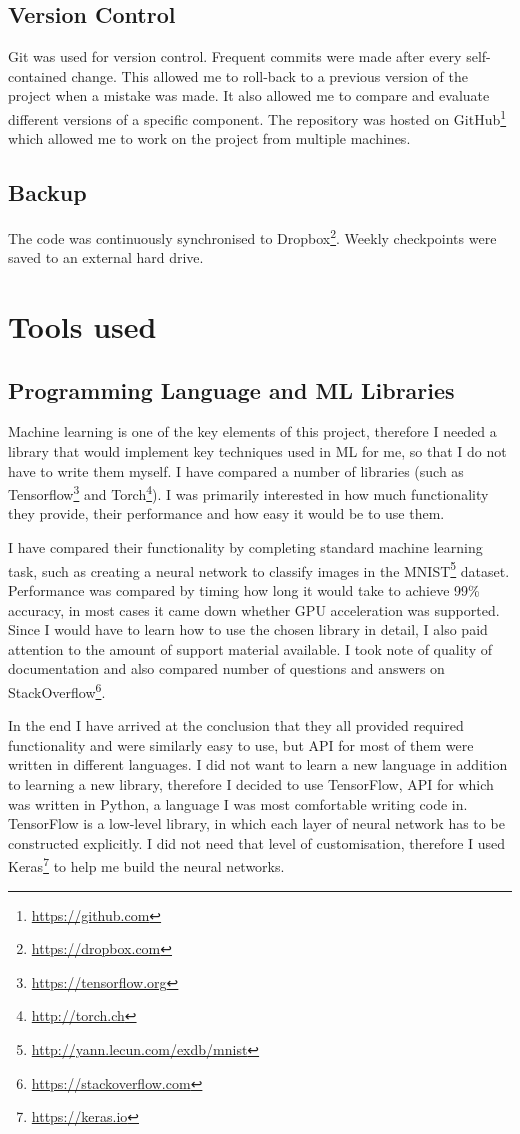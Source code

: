 \documentclass[12pt,a4paper]{book}
\begin{document}
\subsection{Version Control}
Git was used for version control.
Frequent commits were made after every self-contained change.
This allowed me to roll-back to a previous version of the project when a mistake was made.
It also allowed me to compare and evaluate different versions of a specific component.
The repository was hosted on GitHub\footnote{\url{https://github.com}} which allowed me to work on the project from multiple machines.
\subsection{Backup}
The code was continuously synchronised to Dropbox\footnote{\url{https://dropbox.com}}.
Weekly checkpoints were saved to an external hard drive.
\section{Tools used}
\subsection{Programming Language and ML Libraries}
Machine learning is one of the key elements of this project, therefore I needed a library that would implement key techniques used in ML for me, so that I do not have to write them myself.
I have compared a number of libraries (such as Tensorflow\footnote{\url{https://tensorflow.org}} and Torch\footnote{\url{http://torch.ch}}).
I was primarily interested in how much functionality they provide, their performance and how easy it would be to use them.

I have compared their functionality by completing standard machine learning task, such as creating a neural network to classify images in the MNIST\footnote{\url{http://yann.lecun.com/exdb/mnist}} dataset.
Performance was compared by timing how long it would take to achieve 99\% accuracy, in most cases it came down whether GPU acceleration was supported.
Since I would have to learn how to use the chosen library in detail, I also paid attention to the amount of support material available.
I took note of quality of documentation and also compared number of questions and answers on StackOverflow\footnote{\url{https://stackoverflow.com}}.

In the end I have arrived at the conclusion that they all provided required functionality and were similarly easy to use, but API for most of them were written in different languages.
I did not want to learn a new language in addition to learning a new library, therefore I decided to use TensorFlow, API for which was written in Python, a language I was most comfortable writing code in.
TensorFlow is a low-level library, in which each layer of neural network has to be constructed explicitly.
I did not need that level of customisation, therefore I used Keras\footnote{\url{https://keras.io}} to help me build the neural networks.
\end{document}
